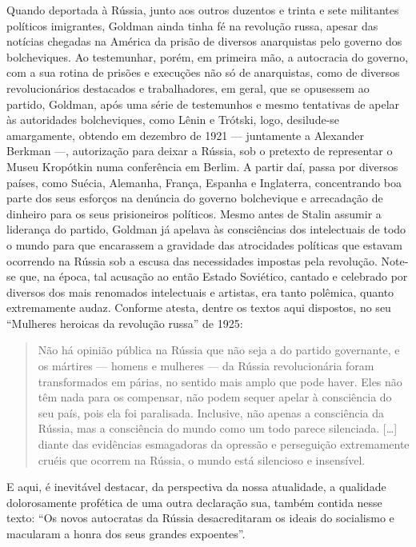 Quando deportada à Rússia, junto aos outros duzentos e trinta e sete
militantes políticos imigrantes, Goldman ainda tinha fé na revolução
russa, apesar das notícias chegadas na América da prisão de diversos
anarquistas pelo governo dos bolcheviques. Ao testemunhar, porém, em
primeira mão, a autocracia do governo, com a sua rotina de prisões e
execuções não só de anarquistas, como de diversos revolucionários
destacados e trabalhadores, em geral, que se opusessem ao partido,
Goldman, após uma série de testemunhos e mesmo tentativas de apelar às
autoridades bolcheviques, como Lênin e Trótski, logo, desilude-se
amargamente, obtendo em dezembro de 1921 --- juntamente a Alexander
Berkman ---, autorização para deixar a Rússia, sob o pretexto de
representar o Museu Kropótkin numa conferência em Berlim. A partir daí,
passa por diversos países, como Suécia, Alemanha, França, Espanha e
Inglaterra, concentrando boa parte dos seus esforços na denúncia do
governo bolchevique e arrecadação de dinheiro para os seus prisioneiros
políticos. Mesmo antes de Stalin assumir a liderança do partido, Goldman
já apelava às consciências dos intelectuais de todo o mundo para que
encarassem a gravidade das atrocidades políticas que estavam ocorrendo
na Rússia sob a escusa das necessidades impostas pela revolução. Note-se
que, na época, tal acusação ao então Estado Soviético, cantado e
celebrado por diversos dos mais renomados intelectuais e artistas, era
tanto polêmica, quanto extremamente audaz. Conforme atesta, dentre os
textos aqui dispostos, no seu ``Mulheres heroicas da revolução russa''
de 1925:

\begin{quote}
Não há opinião pública na Rússia que não seja a do partido governante, e
os mártires --- homens e mulheres --- da Rússia revolucionária foram
transformados em párias, no sentido mais amplo que pode haver. Eles não
têm nada para os compensar, não podem sequer apelar à consciência do seu
país, pois ela foi paralisada. Inclusive, não apenas a consciência da
Rússia, mas a consciência do mundo como um todo parece silenciada.
{[}\ldots{]} diante das evidências esmagadoras da opressão e perseguição
extremamente cruéis que ocorrem na Rússia, o mundo está silencioso e
insensível.
\end{quote}

E aqui, é inevitável destacar, da perspectiva da nossa atualidade, a
qualidade dolorosamente profética de uma outra declaração sua, também
contida nesse texto: ``Os novos autocratas da Rússia desacreditaram os
ideais do socialismo e macularam a honra dos seus grandes expoentes''.

